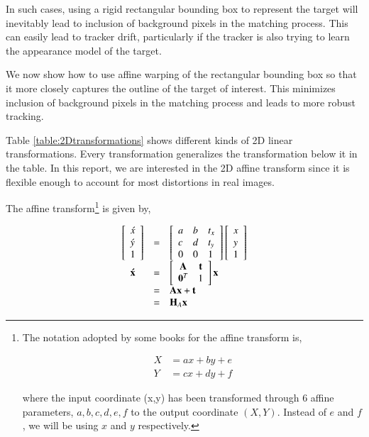 \begin{Body}
In such cases, using a rigid rectangular bounding box to represent the target will inevitably lead to inclusion of background pixels in the matching process.  This can easily lead to tracker drift, particularly if the tracker is also trying to learn the appearance model of the target.

We now show how to use affine warping of the rectangular bounding box so that it more closely captures the outline of the target of interest.  This minimizes inclusion of background pixels in the matching process and leads to more robust tracking.

Table \ref{table:2Dtransformations} shows different kinds of 2D linear transformations.  Every transformation generalizes the transformation below it in the table.  In this report, we are interested in the 2D affine transform since it is flexible enough to account for most distortions in real images.

The affine transform\footnote{The notation adopted by some books for the affine transform is,

\begin{equation}
\begin{array}{llllllll}
X &= ax + by + e\\
Y &= cx + dy + f
\end{array}
\label{Eq:AffineDecomposition}
\end{equation}

where the input coordinate (x,y) has been transformed through 6 affine parameters, $a, b, c, d, e, f$ to the output coordinate $(X,Y)$.  Instead of $e$ and $f$, we will be using $x$ and $y$ respectively.}
 is given by,

\begin{equation}
\begin{array}{cllll}
\left[\begin{array}{l}\acute{x}\\\acute{y}\\1\end{array}\right]   &=& \left[ \begin{array}{lll} a &b & t_x \\ c & d & t_y \\ 0 & 0 & 1 \\ \end{array} \right] \left[\begin{array}{l}x\\y\\1\end{array}\right]\\
\mathbf{\acute{x}} &=& \left[\begin{array}{cccc}\mathbf{A} & \mathbf{t}\\\mathbf{0}^T & 1\end{array}\right] \mathbf{x}\\
&=& \mathbf{A}\mathbf{x} + \mathbf{t}\\
&=& \mathbf{H}_A \mathbf{x}\\
\end{array}
\label{Eqn:top_level}
\end{equation}


\end{Body}
